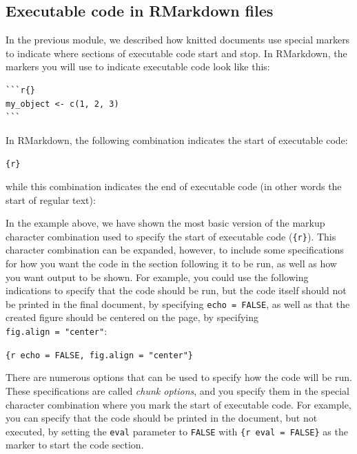 \documentclass[]{tufte-book}
\begin{document}
\subsection{Executable code in RMarkdown files}\label{executable-code-in-rmarkdown-files}

In the previous module, we described how knitted documents use special markers
to indicate where sections of executable code start and stop. In RMarkdown,
the markers you will use to indicate executable code look like this:

\begin{verbatim}
```r{}
my_object <- c(1, 2, 3)
```
\end{verbatim}

In RMarkdown, the following combination indicates
the start of executable code:

\texttt{\textasciigrave{}\textasciigrave{}\textasciigrave{}\{r\}}

\noindent while this combination indicates the end of executable code (in other
words the start of regular text):

\texttt{\textasciigrave{}\textasciigrave{}\textasciigrave{}}

In the example above, we have shown the most basic
version of the markup character combination used to specify the start of
executable code (\texttt{\textasciigrave{}\textasciigrave{}\textasciigrave{}\{r\}}). This character combination can be expanded,
however, to include some specifications for how you want the code in the section
following it to be run, as well as how you want output to be shown. For example,
you could use the following indications to specify that the code should be run,
but the code itself should not be printed in the final document, by specifying
\texttt{echo\ =\ FALSE}, as well as that the created figure should be centered on the
page, by specifying \texttt{fig.align\ =\ "center"}:

\texttt{\textasciigrave{}\textasciigrave{}\textasciigrave{}\{r\ echo\ =\ FALSE,\ fig.align\ =\ "center"\}}

There are numerous options that can be used to specify how the code will be run.
These specifications are called
\emph{chunk options}, and you specify them in the special character combination
where you mark the start of executable code. For example, you can specify that
the code should be printed in the document, but not executed, by setting the
\texttt{eval} parameter to \texttt{FALSE} with \texttt{\textasciigrave{}\textasciigrave{}\textasciigrave{}\{r\ eval\ =\ FALSE\}} as the marker to
start the code section.
\end{document}
